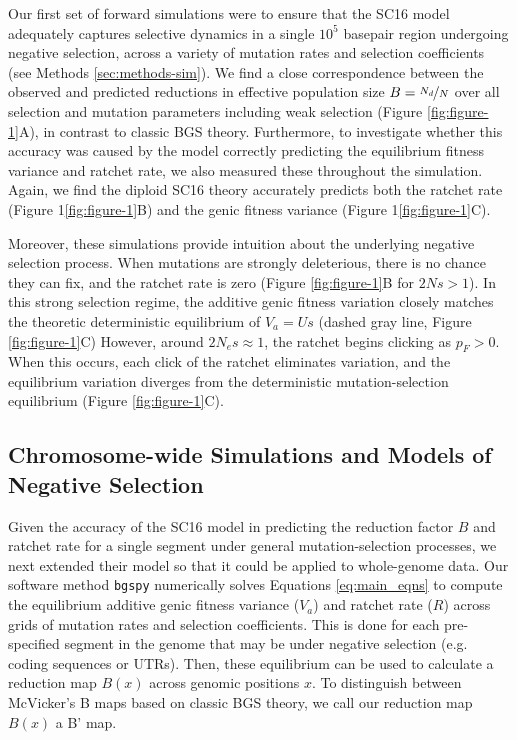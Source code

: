 \documentclass[11pt]{article}
\begin{document}
Our first set of forward simulations were to ensure that the SC16 model
adequately captures selective dynamics in a single $10^5$ basepair region
undergoing negative selection, across a variety of mutation rates and selection
coefficients (see Methods \ref{sec:methods-sim}). We find a close
correspondence between the observed and predicted reductions in effective
population size $B=\nicefrac{N_d}{N}$ over all selection and mutation
parameters including weak selection (Figure \ref{fig:figure-1}A), in contrast
to classic BGS theory. Furthermore, to investigate whether this accuracy was
caused by the model correctly predicting the equilibrium fitness variance and
ratchet rate, we also measured these throughout the simulation. Again, we find
the diploid SC16 theory accurately predicts both the ratchet rate (Figure
1\ref{fig:figure-1}B) and the genic fitness variance (Figure
1\ref{fig:figure-1}C).

Moreover, these simulations provide intuition about the underlying negative
selection process. When mutations are strongly deleterious, there is no chance
they can fix, and the ratchet rate is zero (Figure \ref{fig:figure-1}B for $2Ns
> 1$). In this strong selection regime, the additive genic fitness variation
closely matches the theoretic deterministic equilibrium of $V_a = Us$ (dashed
gray line, Figure \ref{fig:figure-1}C) However, around $2N_e s \approx 1$, the
ratchet begins clicking as $p_F > 0$. When this occurs, each click of the
ratchet eliminates variation, and the equilibrium variation diverges from the
deterministic mutation-selection equilibrium (Figure \ref{fig:figure-1}C).

\subsection*{Chromosome-wide Simulations and Models of Negative Selection}
\label{sec:chrom-sims}

Given the accuracy of the SC16 model in predicting the reduction factor $B$ and
ratchet rate for a single segment under general mutation-selection processes,
we next extended their model so that it could be applied to whole-genome data.
Our software method \texttt{bgspy} numerically solves Equations
\eqref{eq:main_eqns} to compute the equilibrium additive genic fitness variance
($V_a$) and ratchet rate ($R$) across grids of mutation rates and selection
coefficients. This is done for each pre-specified segment in the genome that
may be under negative selection (e.g. coding sequences or UTRs). Then, these
equilibrium can be used to calculate a reduction map $B(x)$ across genomic
positions $x$. To distinguish between McVicker's B maps based on classic BGS
theory, we call our reduction map $B(x)$ a B' map.
\end{document}
